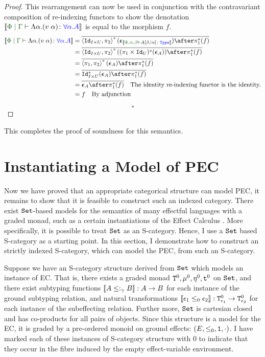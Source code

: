 \documentclass{Report}
\begin{document}
\begin{proof}
    This rearrangement can now be used in conjunction with the contravariant composition of re-indexing functors to show the denotation $\deno{\gpetyperelation{\elam{\a}{(\eapp{v}{\a})}}{\all{\a}{A}}}$ is equal to the morphism $f$.
    \begin{align*}
        \deno{\gpetyperelation{\elam{\a}{(\eapp{v}{\a})}}{\all{\a}{A}}} & = \bar{\pr{\Id{I\times U}}{\pp}\star(\counit{\deno{\typerelation{\P,\a,\b}{A\ssub{\a}{\b}}{\type}}})\after\pstar(f)}\\
        & = \bar{\pr{\Id{I\times U}}{\pp}\star((\p\times\Id{U})\star(\counit{A}))\after\pstar(f)}\\
        & = \bar{\pr{\p}{\pp}\star(\counit{A})\after\pstar(f)}\\
        &= \bar{\Id{I\times U}\star(\counit{A})\after\pstar(f)} \\
        & = \bar{\counit{A}\after \pstar(f)}\qt{The identity re-indexing functor is the identity.}\\
        & = f \qt{By adjunction}
    \end{align*}


    $$\square$$

\end{proof}


This completes the proof of soundness for this semantics.

\chapter{Instantiating a Model of PEC}

Now we have proved that an appropriate categorical structure can model PEC, it remains to show that it is feasible to construct such an indexed category. There exist $\texttt{Set}$-based models for the semantics of many effectful languages with a graded monad, such as a certain instantiations of the Effect Calculus \needsRef{}. More specifically, it is possible to treat $\texttt{Set}$ as an S-category. Hence, I use a $\texttt{Set}$ based S-category as a starting point. In this section, I  demonstrate how to construct an strictly indexed S-category, which can model the PEC, from such an S-category.

Suppose we have an S-category structure derived from $\texttt{Set}$ which models an instance of EC. That is, there exists a graded monad $\texttt{T}^0_{}, \mu^0, \eta_{}^0, \texttt{t}^0$ on $\texttt{Set}$, and there exist subtyping functions ${\bf [\![}A\leq:_\gamma B{\bf ]\!]}: A \rightarrow B$ for each instance of the ground subtyping relation, and natural transformations ${\bf [\![}\epsilon_1 \leq_0 \epsilon_2{\bf ]\!]}: \texttt{T}^0_{\epsilon_1} \rightarrow \texttt{T}^0_{\epsilon_2}$ for each instance of the subeffecting relation. Further more, $\texttt{Set}$ is cartesian closed and has co-products for all pairs of objects. Since this structure is a model for the EC, it is graded by a pre-ordered monoid on ground effects: $(E, \leq_0, \texttt{1}, \cdot)$. I have marked each of these instances of S-category structure with $0$ to indicate that they occur in the fibre induced by the empty effect-variable environment.
\end{document}
